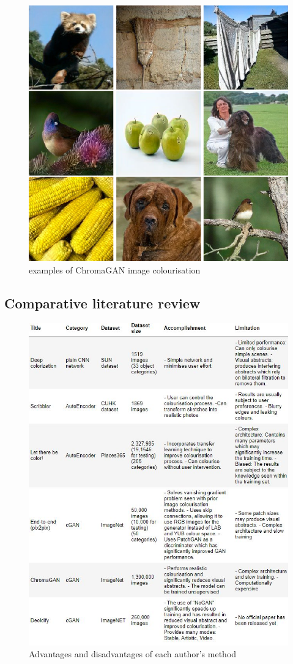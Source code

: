 \begin{figure}[H]
    \centering
    \includegraphics[width=0.5\columnwidth]{sections/figures/ChromaGAN.png}
    \caption{examples of ChromaGAN image colourisation}
    \label{fig:my_label}
\end{figure}




\subsection{Comparative literature review}


\begin{figure}[H]
    \centering
    \includegraphics[scale=1,width=1\columnwidth]{sections/appendix/comparison.JPG}
    \caption{Advantages and disadvantages of each author's method}
    \label{fig:my_label}
\end{figure}

